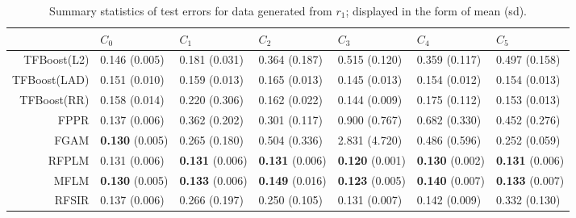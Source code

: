 \renewcommand{\arraystretch}{1.5}
\addtolength{\tabcolsep}{-3pt}    

\begin{table}[H]
\centering
\footnotesize
\begin{tabular}{rllllll}
  \hline
 & $C_0$ & $C_1$ & $C_2$ & $C_3$ & $C_4$ & $C_5$ \\ 
  \hline
TFBoost(L2) & 0.146 (0.005) & 0.181 (0.031) & 0.364 (0.187) & 0.515 (0.120) & 0.359 (0.117) & 0.497 (0.158) \\ 
  TFBoost(LAD) & 0.151 (0.010) & 0.159 (0.013) & 0.165 (0.013) & 0.145 (0.013) & 0.154 (0.012) & 0.154 (0.013) \\ 
  TFBoost(RR) & 0.158 (0.014) & 0.220 (0.306) & 0.162 (0.022) & 0.144 (0.009) & 0.175 (0.112) & 0.153 (0.013) \\ 
  FPPR & 0.137 (0.006) & 0.362 (0.202) & 0.301 (0.117) & 0.900 (0.767) & 0.682 (0.330) & 0.452 (0.276) \\ 
  FGAM & \textbf{0.130} (0.005) & 0.265 (0.180) & 0.504 (0.336) & 2.831 (4.720) & 0.486 (0.596) & 0.252 (0.059) \\ 
  RFPLM & 0.131 (0.006) & \textbf{0.131} (0.006) & \textbf{0.131} (0.006) & \textbf{0.120} (0.001) & \textbf{0.130} (0.002) & \textbf{0.131} (0.006) \\ 
  MFLM & \textbf{0.130} (0.005) & \textbf{0.133} (0.006) & \textbf{0.149} (0.016) & \textbf{0.123} (0.005) & \textbf{0.140} (0.007) & \textbf{0.133} (0.007) \\ 
  RFSIR & 0.137 (0.006) & 0.266 (0.197) & 0.250 (0.105) & 0.131 (0.007) & 0.142 (0.009) & 0.332 (0.130) \\ 
   \hline
\end{tabular}
\caption{Summary statistics of test errors for data generated from $r_1$; displayed in the form of mean (sd).} 
\end{table}
